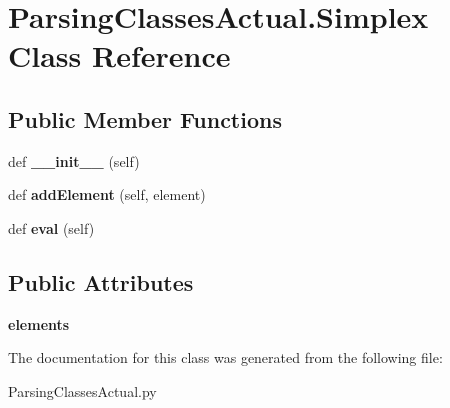 \hypertarget{class_parsing_classes_actual_1_1_simplex}{}\section{Parsing\+Classes\+Actual.\+Simplex Class Reference}
\label{class_parsing_classes_actual_1_1_simplex}
\subsection*{Public Member Functions}
\begin{DoxyCompactItemize}
\item 
def {\bfseries \+\_\+\+\_\+init\+\_\+\+\_\+} (self)\hypertarget{class_parsing_classes_actual_1_1_simplex_a4f09c613fb672e206b532b5abb96576e}{}\label{class_parsing_classes_actual_1_1_simplex_a4f09c613fb672e206b532b5abb96576e}

\item 
def {\bfseries add\+Element} (self, element)\hypertarget{class_parsing_classes_actual_1_1_simplex_a5c2423d5d737475748de577076863d57}{}\label{class_parsing_classes_actual_1_1_simplex_a5c2423d5d737475748de577076863d57}

\item 
def {\bfseries eval} (self)\hypertarget{class_parsing_classes_actual_1_1_simplex_a5955c7802478a8ed5e31a0264a32ac41}{}\label{class_parsing_classes_actual_1_1_simplex_a5955c7802478a8ed5e31a0264a32ac41}

\end{DoxyCompactItemize}
\subsection*{Public Attributes}
\begin{DoxyCompactItemize}
\item 
{\bfseries elements}\hypertarget{class_parsing_classes_actual_1_1_simplex_ae4c51bf50905e135df64c996c63b1247}{}\label{class_parsing_classes_actual_1_1_simplex_ae4c51bf50905e135df64c996c63b1247}

\end{DoxyCompactItemize}


The documentation for this class was generated from the following file\+:\begin{DoxyCompactItemize}
\item 
Parsing\+Classes\+Actual.\+py\end{DoxyCompactItemize}
